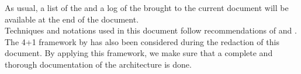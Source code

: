 
As usual, a list of the  and a log of the  brought to the current document will be available at the end of the document.  \\

Techniques and notations used in this document follow recommendations of \cite{bass2013} and \cite{larman2005}. The 4+1 framework by \cite{4plus1} has also been considered during the redaction of this document. By applying this framework, we make sure that a complete and thorough documentation of the architecture is done.
